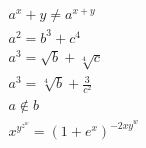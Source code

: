 \documentclass{article}
\begin{document}
{
    \begin{gather}
        a^x+y\neq a^{x+y} \\
        a^2 = b^3 + c^4 \\
        a^3 = \sqrt{b} + \sqrt[4]{c} \\
        a^3 = \sqrt[4]{b} + \frac{3}{c^2} \\
        a\notin b \\%
        x^{y^{z^w}} = (1+e^x)^{{-2xy}^w} %
    \end{gather}
}
    
\end{document}
